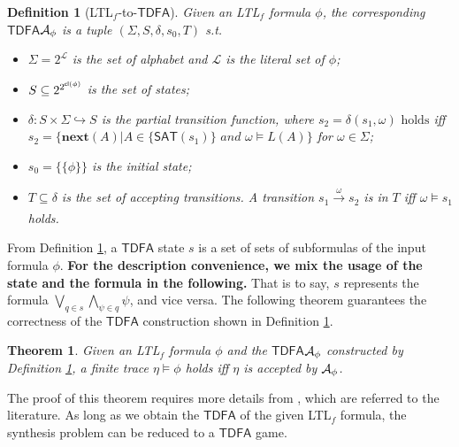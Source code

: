 \documentclass[letterpaper]{article} %
\newcommand{\ltlf}{\textsf{LTL}$_f$\xspace}
\newtheorem{theorem}{Theorem}
\newtheorem{definition}{Definition}
\newcommand{\tran}[1]{\xrightarrow[]{#1}}
\def\tdfa{$\mathsf{TDFA}$\xspace}
\def\TDFA{$\mathsf{TDFA}$\xspace}
\def\SAT{\textsf{SAT}\xspace}
\newcommand{\cl}{{\sf cl}\xspace}
\begin{document}
\begin{definition}[\ltlf-to-\tdfa]\label{def:ltlf2dfa}
Given an \ltlf formula $\phi$, the corresponding \TDFA ${\mathcal{A}_{\phi}}$ is a tuple $(\Sigma, S, \delta, s_0, T)$ s.t.
\begin{itemize}
	\item $\Sigma = 2^{\mathcal{L}}$ is the set of alphabet and $\mathcal{L}$ is the literal set of $\phi$;
	\item $S\subseteq 2^{2^{\cl(\phi)}}$ is the set of states;
	\item $\delta:  S \times \Sigma \hookrightarrow S$ is the partial transition function, where $s_2 = \delta(s_1, \omega) \mbox{ holds}$ iff $s_2=\{\mathbf{next}(A) | A\in\{\SAT(s_1)\}\textit{ and }\omega \models L(A)\}$ for $\omega \in \Sigma$;
	\item $s_0 = \{\{\phi \}\}$ is the initial state;
	\item $T\subseteq \delta$ is the set of accepting transitions. A transition $s_1\tran{\omega}s_2$ is in $T$ iff $\omega\models s_1$ holds. 
\end{itemize}

\end{definition}

From Definition \ref{def:ltlf2dfa}, a \tdfa state $s$ is a set of sets of subformulas of the input formula $\phi$. \textbf{For the description convenience, we mix the usage of the state and the formula in the following.} That is to say, $s$ represents the formula $\bigvee_{q\in s}\bigwedge_{\psi\in q} \psi$, and vice versa. The following theorem guarantees the correctness of the \tdfa construction shown in Definition \ref{def:ltlf2dfa}. 

\begin{theorem}\label{thm:ltlf2tdfa}
Given an \ltlf formula $\phi$ and the \tdfa ${\mathcal{A}_{\phi}}$ constructed by Definition \ref{def:ltlf2dfa}, a finite trace $\eta\models\phi$ holds iff $\eta$ is accepted by ${\mathcal{A}_{\phi}}$. 
\end{theorem}
The proof of this theorem requires more details from \cite{LRPZV19}, which are referred to the literature. %
As long as we obtain the \tdfa of the given \ltlf formula, the synthesis problem can be reduced to a \tdfa game.
\end{document}
